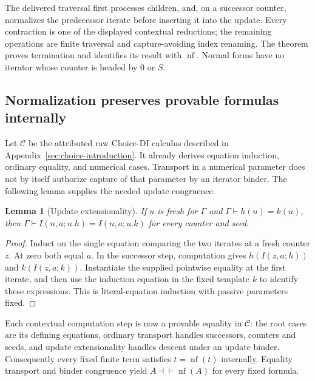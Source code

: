\documentclass[11pt,letterpaper]{article}
\newtheorem{lemma}[theorem]{Lemma}
\theoremstyle{definition}\newtheorem{definition}[theorem]{Definition}
\theoremstyle{remark}\newtheorem{remark}[theorem]{Remark}
\newcommand{\nf}{\operatorname{nf}}
\begin{document}
The delivered traversal first processes children, and, on a successor
counter, normalizes the predecessor iterate before inserting it into the
update. Every contraction is one of the displayed contextual reductions;
the remaining operations are finite traversal and capture-avoiding index
renaming. The theorem proves termination and identifies its result with
$\nf$. Normal forms have no iterator whose counter is headed by $0$ or $S$.

\subsection{Normalization preserves provable formulas internally}

Let $\mathcal C$ be the attributed raw Choice-DI calculus described in
Appendix~\ref{sec:choice-introduction}. It already derives equation induction,
ordinary equality, and numerical cases. Transport in a numerical parameter
does not by itself authorize capture of that parameter by an iterator binder.
The following lemma supplies the needed update congruence.

\begin{lemma}[Update extensionality]
If $u$ is fresh for $\Gamma$ and $\Gamma\vdash h(u)=k(u)$, then
$\Gamma\vdash I(n,a;u.h)=I(n,a;u.k)$ for every counter and seed.
\end{lemma}
\begin{proof}
Induct on the single equation comparing the two iterates at a fresh counter
$z$. At zero both equal $a$. In the successor step, computation gives
$h(I(z,a;h))$ and $k(I(z,a;k))$. Instantiate the supplied pointwise equality
at the first iterate, and then use the induction equation in the fixed
template $k$ to identify these expressions. This is literal-equation
induction with passive parameters fixed.
\end{proof}

Each contextual computation step is now a provable equality in
$\mathcal C$: the root cases are its defining equations, ordinary
transport handles successors, counters and seeds, and update extensionality
handles descent under an update binder. Consequently every fixed finite
term satisfies $t=\nf(t)$ internally. Equality transport and binder
congruence yield $A\dashv\vdash\nf(A)$ for every fixed formula.
\end{document}
